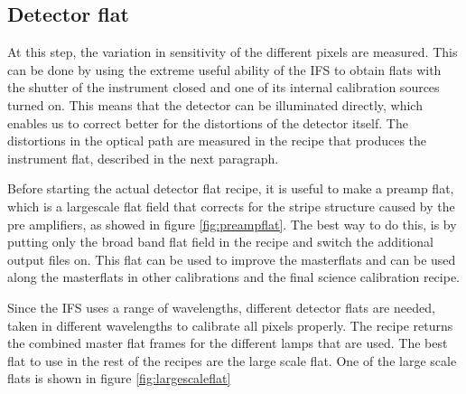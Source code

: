 \documentclass[twoside,single]{lion-msc}
\begin{document}
\subsection{Detector flat}
At this step, the variation in sensitivity of the different pixels are measured. This can be done by using the extreme useful ability of the IFS to obtain flats with the shutter of the instrument closed and one of its internal calibration sources turned on. This means that the detector can be illuminated directly, which enables us to correct better for the distortions of the detector itself. The distortions in the optical path are measured in the recipe that produces the instrument flat, described in the next paragraph. 
\bigskip

Before starting the actual detector flat recipe, it is useful to make a preamp flat, which is a largescale flat field that corrects for the stripe structure caused by the pre amplifiers, as showed in figure \ref{fig:preampflat}. The best way to do this, is by putting only the broad band flat field in the recipe and switch the additional output files on. This flat can be used to improve the masterflats and can be used along the masterflats in other calibrations and the final science calibration recipe.
\bigskip

Since the IFS uses a range of wavelengths, different detector flats are needed, taken in different wavelengths to calibrate all pixels properly. The recipe returns the combined master flat frames for the different lamps that are used. The best flat to use in the rest of the recipes are the large scale flat. One of the large scale flats is shown in figure \ref{fig:largescaleflat}
\end{document}
